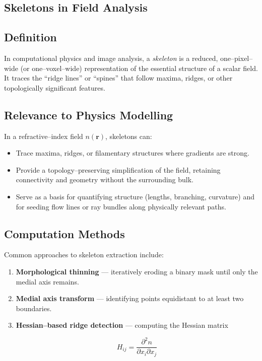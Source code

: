 \documentclass[10pt,a4paper]{article}
\begin{document}
\begin{multicols}{2}

\section*{Skeletons in Field Analysis}

\subsection*{Definition}
In computational physics and image analysis, a \emph{skeleton} is a reduced, one--pixel--wide (or one--voxel--wide) representation of the essential structure of a scalar field. It traces the ``ridge lines'' or ``spines'' that follow maxima, ridges, or other topologically significant features.

\subsection*{Relevance to Physics Modelling}
In a refractive--index field $n(\mathbf{r})$, skeletons can:
\begin{itemize}
    \item Trace maxima, ridges, or filamentary structures where gradients are strong.
    \item Provide a topology--preserving simplification of the field, retaining connectivity and geometry without the surrounding bulk.
    \item Serve as a basis for quantifying structure (lengths, branching, curvature) and for seeding flow lines or ray bundles along physically relevant paths.
\end{itemize}

\subsection*{Computation Methods}
Common approaches to skeleton extraction include:
\begin{enumerate}
    \item \textbf{Morphological thinning} --- iteratively eroding a binary mask until only the medial axis remains.
    \item \textbf{Medial axis transform} --- identifying points equidistant to at least two boundaries.
    \item \textbf{Hessian--based ridge detection} --- computing the Hessian matrix
    

\[
    H_{ij} = \frac{\partial^2 n}{\partial x_i \partial x_j}
    \]



\end{enumerate}
\end{multicols}
\end{document}
